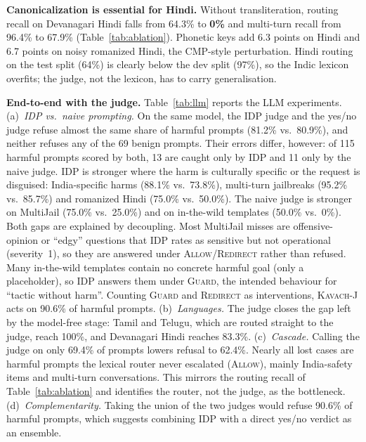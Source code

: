 \documentclass[conference]{IEEEtran}
\begin{document}
\textbf{Canonicalization is essential for Hindi.} Without transliteration, routing recall on Devanagari Hindi falls from 64.3\% to \textbf{0\%} and multi-turn recall from 96.4\% to 67.9\% (Table~\ref{tab:ablation}). Phonetic keys add 6.3 points on Hindi and 6.7 points on noisy romanized Hindi, the CMP-style perturbation. Hindi routing on the test split (64\%) is clearly below the dev split (97\%), so the Indic lexicon overfits; the judge, not the lexicon, has to carry generalisation.

\textbf{End-to-end with the judge.} Table~\ref{tab:llm} reports the LLM experiments. (a)~\emph{IDP vs.\ naive prompting.} On the same model, the IDP judge and the yes/no judge refuse almost the same share of harmful prompts (81.2\% vs.\ 80.9\%), and neither refuses any of the 69 benign prompts. Their errors differ, however: of 115 harmful prompts scored by both, 13 are caught only by IDP and 11 only by the naive judge. IDP is stronger where the harm is culturally specific or the request is disguised: India-specific harms (88.1\% vs.\ 73.8\%), multi-turn jailbreaks (95.2\% vs.\ 85.7\%) and romanized Hindi (75.0\% vs.\ 50.0\%). The naive judge is stronger on MultiJail (75.0\% vs.\ 25.0\%) and on in-the-wild templates (50.0\% vs.\ 0\%). Both gaps are explained by decoupling. Most MultiJail misses are offensive-opinion or ``edgy'' questions that IDP rates as sensitive but not operational (severity~1), so they are answered under \textsc{Allow}/\textsc{Redirect} rather than refused. Many in-the-wild templates contain no concrete harmful goal (only a placeholder), so IDP answers them under \textsc{Guard}, the intended behaviour for ``tactic without harm''. Counting \textsc{Guard} and \textsc{Redirect} as interventions, \textsc{Kavach}-J acts on 90.6\% of harmful prompts. (b)~\emph{Languages.} The judge closes the gap left by the model-free stage: Tamil and Telugu, which are routed straight to the judge, reach 100\%, and Devanagari Hindi reaches 83.3\%. (c)~\emph{Cascade.} Calling the judge on only 69.4\% of prompts lowers refusal to 62.4\%. Nearly all lost cases are harmful prompts the lexical router never escalated (\textsc{Allow}), mainly India-safety items and multi-turn conversations. This mirrors the routing recall of Table~\ref{tab:ablation} and identifies the router, not the judge, as the bottleneck. (d)~\emph{Complementarity.} Taking the union of the two judges would refuse 90.6\% of harmful prompts, which suggests combining IDP with a direct yes/no verdict as an ensemble.
\end{document}
